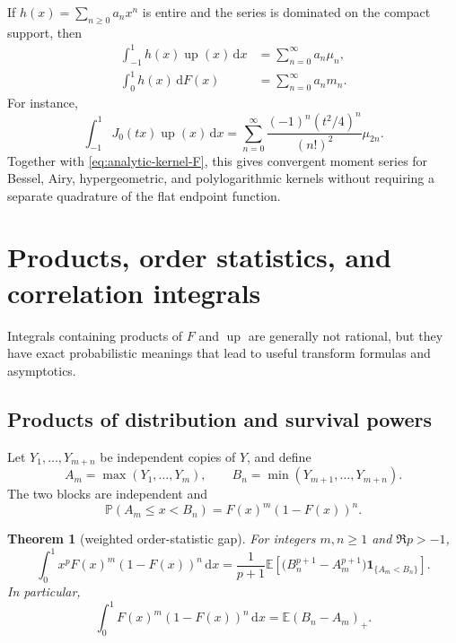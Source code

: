 \documentclass[11pt,oneside]{article}
\newtheorem{theorem}{Theorem}[section]
\theoremstyle{definition}
\newcommand{\F}{F}
\newcommand{\upf}{\operatorname{up}}
\newcommand{\E}{\mathbb E}
\newcommand{\Prob}{\mathbb P}
\newcommand{\dd}{\,\mathrm d}
\newcommand{\ind}{\mathbf 1}
\begin{document}
If \(h(x)=\sum_{n\ge0}a_nx^n\) is entire and the series is dominated on the compact
support, then
\begin{align}
 \int_{-1}^1h(x)\upf(x)\dd x
 &=\sum_{n=0}^{\infty}a_n\mu_n,
 \label{eq:entire-kernel-up}\\
 \int_0^1h(x)\dd\F(x)
 &=\sum_{n=0}^{\infty}a_nm_n.
 \label{eq:entire-kernel-dF}
\end{align}
For instance,
\begin{equation}\label{eq:Bessel-up}
 \int_{-1}^1J_0(tx)\upf(x)\dd x
 =\sum_{n=0}^{\infty}
 \frac{(-1)^n(t^2/4)^n}{(n!)^2}\mu_{2n}.
\end{equation}
Together with \cref{eq:analytic-kernel-F}, this gives convergent moment series for
Bessel, Airy, hypergeometric, and polylogarithmic kernels without requiring a separate
quadrature of the flat endpoint function.

\section{Products, order statistics, and correlation integrals}

Integrals containing products of \(\F\) and \(\upf\) are generally not rational, but
they have exact probabilistic meanings that lead to useful transform formulas and
asymptotics.

\subsection{Products of distribution and survival powers}

Let \(Y_1,\ldots,Y_{m+n}\) be independent copies of \(Y\), and define
\begin{equation}\label{eq:Amax-Bmin}
 A_m=\max(Y_1,\ldots,Y_m),
 \qquad
 B_n=\min(Y_{m+1},\ldots,Y_{m+n}).
\end{equation}
The two blocks are independent and
\begin{equation}\label{eq:gap-event}
 \Prob(A_m\le x<B_n)=\F(x)^m(1-\F(x))^n.
\end{equation}

\begin{theorem}[weighted order-statistic gap]\label{thm:order-gap}
For integers \(m,n\ge1\) and \(\Re p>-1\),
\begin{equation}\label{eq:weighted-gap}
 \int_0^1x^p\F(x)^m(1-\F(x))^n\dd x
 =\frac1{p+1}\E\left[
 \bigl(B_n^{p+1}-A_m^{p+1}\bigr)\ind_{\{A_m<B_n\}}
 \right].
\end{equation}
In particular,
\begin{equation}\label{eq:gap-unweighted}
 \int_0^1\F(x)^m(1-\F(x))^n\dd x
 =\E(B_n-A_m)_+.
\end{equation}
\end{theorem}
\end{document}

